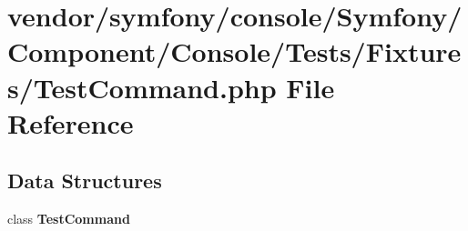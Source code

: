 \section{vendor/symfony/console/\+Symfony/\+Component/\+Console/\+Tests/\+Fixtures/\+Test\+Command.php File Reference}
\label{_test_command_8php}
\subsection*{Data Structures}
\begin{DoxyCompactItemize}
\item 
class {\bf Test\+Command}
\end{DoxyCompactItemize}
